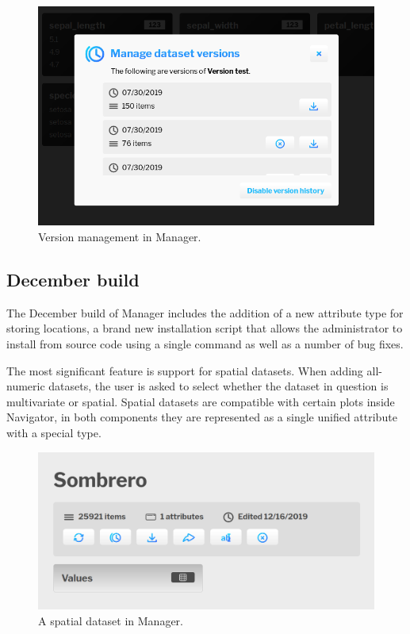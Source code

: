 \documentclass[thesis=M,english,hidelinks]{FITthesisXE}[2012/06/26]
\begin{document}
\begin{figure}[ht]
\centering
\includegraphics[scale=0.4]{manager_versions}
\caption{Version management in Manager.}
\label{fig:manager_versions}
\end{figure}

\subsection{December build}

The December build of Manager includes the addition of a new attribute type for storing locations, a brand new installation script that allows the administrator to install from source code using a single command as well as a number of bug fixes.

The most significant feature is support for spatial datasets. When adding all-numeric datasets, the user is asked to select whether the dataset in question is multivariate or spatial. Spatial datasets are compatible with certain plots inside Navigator, in both components they are represented as a single unified attribute with a special type.

\begin{figure}[ht]
\centering
\includegraphics[scale=0.35]{manager_matrix}
\caption{A spatial dataset in Manager.}
\label{fig:manager_matrix}
\end{figure}
\end{document}
